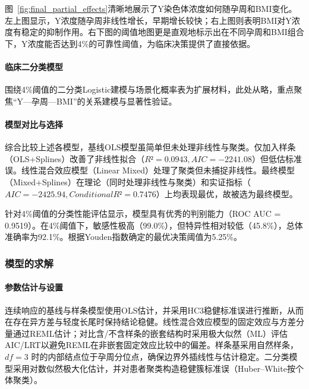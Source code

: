 \documentclass[withoutpreface]{cumcmthesis}
\begin{document}
图~\ref{fig:final_partial_effects}清晰地展示了Y染色体浓度如何随孕周和BMI变化。左上图显示，Y浓度随孕周非线性增长，早期增长较快；右上图则表明BMI对Y浓度有稳定的抑制作用。右下图的阈值地图更是直观地标示出在不同孕周和BMI组合下，Y浓度能否达到4\%的可靠性阈值，为临床决策提供了直接依据。




\paragraph{临床二分类模型}
围绕4\%阈值的二分类Logistic建模与场景化概率表为扩展材料，此处从略，重点聚焦“Y—孕周—BMI”的关系建模与显著性验证。

\paragraph{模型对比与选择}

综合比较上述各模型，基线OLS模型虽简单但未处理非线性与聚类。仅加入样条（OLS+Splines）改善了非线性拟合（$R²=0.0943, AIC=-2241.08$）但低估标准误。线性混合效应模型（Linear Mixed）处理了聚类但未捕捉非线性。最终模型（Mixed+Splines）在理论（同时处理非线性与聚类）和实证指标（$AIC=-2425.94, Conditional R²=0.7476$）上均表现最优，故被选为最终模型。

针对4\%阈值的分类性能评估显示，模型具有优秀的判别能力（ROC AUC = 0.9519）。在4\%阈值下，敏感性极高（99.0\%），但特异性相对较低（45.8\%），总体准确率为92.1\%。根据Youden指数确定的最优决策阈值为5.25\%。

\subsubsection{模型的求解}
\paragraph{参数估计与设置}
连续响应的基线与样条模型使用OLS估计，并采用HC3稳健标准误进行推断，从而在存在异方差与轻度长尾时保持结论稳健。线性混合效应模型的固定效应与方差分量通过REML估计；对比含/不含样条的嵌套结构时采用极大似然（ML）评估AIC/LRT以避免REML在非嵌套固定效应比较中的偏差。样条基采用自然样条，$df=3$ 时的内部结点位于孕周分位点，确保边界外插线性与估计稳定。二分类模型采用对数似然极大化估计，并对患者聚类构造稳健簇标准误（Huber–White按个体聚类）。
\end{document}
